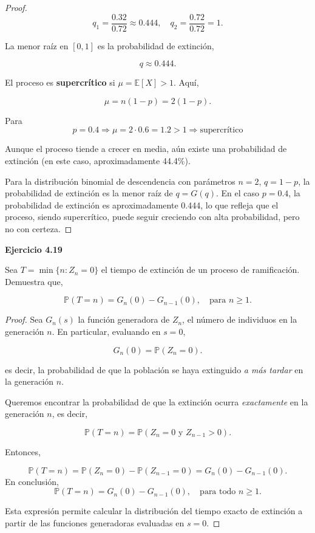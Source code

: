 \documentclass{article}
\begin{document}
\begin{proof}
\[
q_1 = \frac{0.32}{0.72} \approx 0.444,\quad q_2 = \frac{0.72}{0.72} = 1.
\]

La menor raíz en \( [0,1] \) es la probabilidad de extinción,

\[
    q \approx 0.444.
\]

El proceso es \textbf{supercrítico} si \( \mu = \mathbb{E}[X] > 1 \). Aquí,

\[
\mu = n(1 - p) = 2(1 - p).
\]

Para \[ p = 0.4 \Rightarrow \mu = 2 \cdot 0.6 = 1.2 > 1 \Rightarrow \text{supercrítico}
\]

Aunque el proceso tiende a crecer en media, aún existe una probabilidad de extinción (en este caso, aproximadamente 44.4\%).

Para la distribución binomial de descendencia con parámetros \( n = 2 \), \( q = 1 - p \), la probabilidad de extinción es la menor raíz de \( q = G(q) \). En el caso \( p = 0.4 \), la probabilidad de extinción es aproximadamente 0.444, lo que refleja que el proceso, siendo supercrítico, puede seguir creciendo con alta probabilidad, pero no con certeza.
\end{proof}

\textbf{Ejercicio 4.19}

Sea \( T = \min\{n : Z_n = 0\} \) el tiempo de extinción de un proceso de ramificación. Demuestra que,

\[
\mathbb{P}(T = n) = G_n(0) - G_{n-1}(0), \quad \text{para } n \geq 1.
\]

\begin{proof}
Sea \( G_n(s) \) la función generadora de \( Z_n \), el número de individuos en la generación \( n \). En particular, evaluando en \( s = 0 \),

\[
G_n(0) = \mathbb{P}(Z_n = 0).
\]

es decir, la probabilidad de que la población se haya extinguido \emph{a más tardar} en la generación \( n \).

Queremos encontrar la probabilidad de que la extinción ocurra \emph{exactamente} en la generación \( n \), es decir,

\[
\mathbb{P}(T = n) = \mathbb{P}(Z_n = 0 \text{ y } Z_{n-1} > 0).
\]

Entonces,

\[
\mathbb{P}(T = n) = \mathbb{P}(Z_n = 0) - \mathbb{P}(Z_{n-1} = 0)
= G_n(0) - G_{n-1}(0).
\]
En conclusión,
\[
\mathbb{P}(T = n) = G_n(0) - G_{n-1}(0), \quad \text{para todo } n \geq 1.
\]

Esta expresión permite calcular la distribución del tiempo exacto de extinción a partir de las funciones generadoras evaluadas en \( s = 0 \).
\end{proof}
\end{document}
